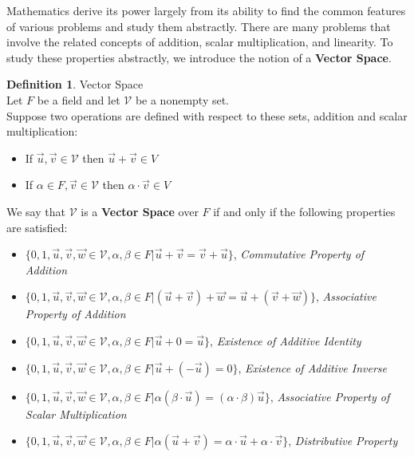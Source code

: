 \documentclass{book}
\theoremstyle{definition}
\newtheorem{definition}{Definition}[section]
\theoremstyle{remark}
\newcommand{\m}{\cdot}
\begin{document}
\newpage
Mathematics derive its power largely from its ability to find the common features of various problems and study them abstractly. There are many problems that involve the related concepts of addition, scalar multiplication, and linearity. To study these properties abstractly, we introduce the notion of a \textbf{Vector Space}. 

\begin{definition}
Vector Space \\

    Let $F$ be a field and let $\mathcal{V}$ be a nonempty set. \\
    Suppose two operations are defined with respect to these sets, addition and scalar multiplication: 
        \begin{itemize}
            \item If $\vec{u}, \vec{v} \in \mathcal{V}$ then $\vec{u} + \vec{v} \in V$
            \item If $\alpha \in F, \vec{v} \in \mathcal{V}$ then $\alpha \m \vec{v} \in V$
        \end{itemize}
    We say that $\mathcal{V}$ is a \textbf{Vector Space} over $F$ if and only if the following properties are satisfied:
        \begin{itemize}
            \item $\{ 0, 1, \vec{u}, \vec{v}, \vec{w} \in \mathcal{V}, \alpha, \beta \in F   | \vec{u} + \vec{v} = \vec{v} + \vec{u} \}$, \textit{Commutative Property of Addition}        
            \item $\{ 0, 1, \vec{u}, \vec{v}, \vec{w} \in \mathcal{V}, \alpha, \beta \in F   | (\vec{u} + \vec{v}) + \vec{w} = \vec{u} + (\vec{v} + \vec{w}) \}$, \textit{Associative Property of Addition}          
            \item $\{ 0, 1, \vec{u}, \vec{v}, \vec{w} \in \mathcal{V}, \alpha, \beta \in F   | \vec{u} + 0 = \vec{u} \}$, \textit{Existence of Additive Identity}         
            \item $\{ 0, 1, \vec{u}, \vec{v}, \vec{w} \in \mathcal{V}, \alpha, \beta \in F   | \vec{u} + (-\vec{u}) = 0 \}$, \textit{Existence of Additive Inverse}
            \item $\{ 0, 1, \vec{u}, \vec{v}, \vec{w} \in \mathcal{V}, \alpha, \beta \in F   | \alpha (\beta \m \vec{u}) = (\alpha \m \beta)\vec{u} \}$, \textit{Associative Property of Scalar Multiplication} 
            \item $\{ 0, 1, \vec{u}, \vec{v}, \vec{w} \in \mathcal{V}, \alpha, \beta \in F   | \alpha(\vec{u} + \vec{v}) = \alpha \m \vec{u} + \alpha \m \vec{v} \}$, \textit{Distributive Property}

\end{itemize}
\end{definition}
\end{document}
